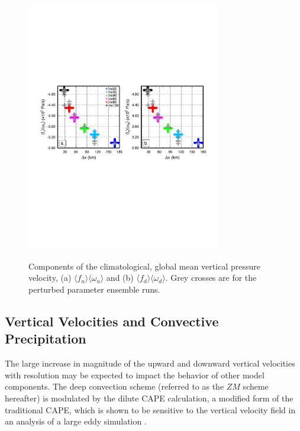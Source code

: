 \documentclass[times]{qjrms4}
\begin{document}
\begin{figure}
\begin{center}
\noindent\includegraphics[width=20pc,angle=0]{figs/temp_diags_2panel.pdf}\\
\end{center}
\caption{Components of the climatological, global mean vertical pressure velocity, (a) $\langle f_{u} \rangle \langle \omega_{u} \rangle$ and (b) $\langle f_{d} \rangle \langle \omega_{d} \rangle$. Grey crosses are for the perturbed parameter ensemble runs.}
\label{fig:2panel}
\end{figure}

\subsection{Vertical Velocities and Convective Precipitation}

The large increase in magnitude of the upward and downward vertical velocities with resolution may be expected to impact the behavior of other model components. The \cite{ZM1995AO} deep convection scheme (referred to as the $ZM$ scheme hereafter) is modulated by the dilute CAPE calculation, a modified form of the traditional CAPE, which is shown to be sensitive to the vertical velocity field in an analysis of a large eddy simulation \citep{SZ2018JCLIM}. 
\end{document}
